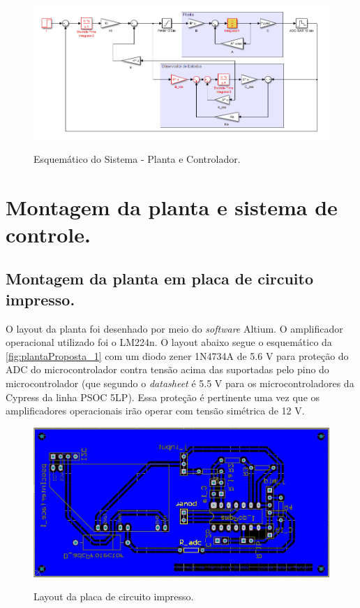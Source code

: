 \documentclass[
	article,			%
	11pt,				%
	oneside,			%
	a4paper,			%
	english,			%
	brazil,				%
	sumario=tradicional
	]{abntex2}
\begin{document}
\begin{figure}[htb!]
	\centering
	\caption{Esquemático do Sistema - Planta e Controlador.}
	\includegraphics[scale=0.6]{./img/modeloSistemaDeControle_intro.PNG}
	\label{fig:esquematico_1}
\end{figure}

\pagebreak



\section{\textbf{Montagem da planta e sistema de controle.}}

\subsection{Montagem da planta em placa de circuito impresso.}
 
O layout da planta foi desenhado por meio do \textit{software} Altium. O amplificador operacional utilizado foi o LM224n. O layout abaixo segue o esquemático da \autoref{fig:plantaProposta_1} com um diodo zener 1N4734A de 5.6 V para proteção do ADC do microcontrolador contra tensão acima das suportadas pelo pino do microcontrolador (que segundo o \textit{datasheet} é 5.5 V para os microcontroladores da Cypress da linha PSOC 5LP).
Essa proteção é pertinente uma vez que os amplificadores operacionais irão operar com tensão simétrica de 12 V. 

\begin{figure}[htb!]
	\centering
	\caption{Layout da placa de circuito impresso.}
	\includegraphics[scale=0.5]{./img/layout.JPG}
	\label{fig:layout}
\end{figure}
\end{document}
